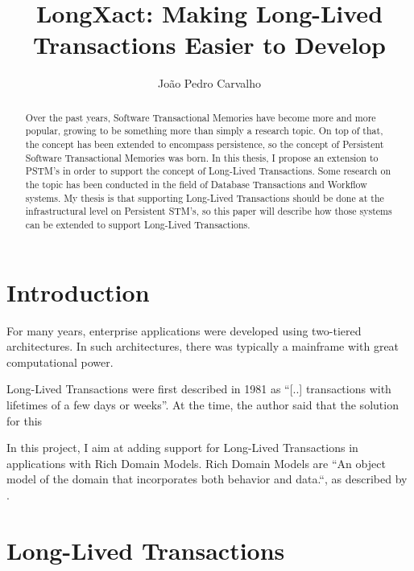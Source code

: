 \documentclass{llncs}
\begin{document}
\title{LongXact: Making Long-Lived Transactions Easier to Develop}

\author{João Pedro Carvalho}
\maketitle


\begin{abstract}
Over the past years, Software Transactional Memories have become more
and more popular, growing to be something more than simply a research topic. On top of
that, the concept has been extended to encompass persistence, so
the concept of Persistent Software Transactional Memories was born. In
this thesis, I propose an extension to PSTM's in order to support the
concept of Long-Lived Transactions. Some research on the topic has
been conducted in the field of Database Transactions and Workflow
systems. My thesis is that supporting Long-Lived Transactions should
be done at the infrastructural level on Persistent STM's, so this
paper will describe how those systems can be extended to support
Long-Lived Transactions.
\end{abstract}


\section{Introduction}

For many years, enterprise applications were developed using
two-tiered architectures. In such architectures, there was typically a
mainframe with great computational power.

Long-Lived Transactions were first described in
1981 as ``[..] transactions with lifetimes of a few days or
weeks''\cite{gray1981transaction}. At the time, the author said that the
solution for this 

In this project, I aim at adding support for Long-Lived Transactions
in applications with Rich Domain Models.
Rich Domain Models are ``An object model of the domain that
incorporates both behavior and data.``, as described by \cite{fowler2003patterns}.

\section{Long-Lived Transactions}
\end{document}
